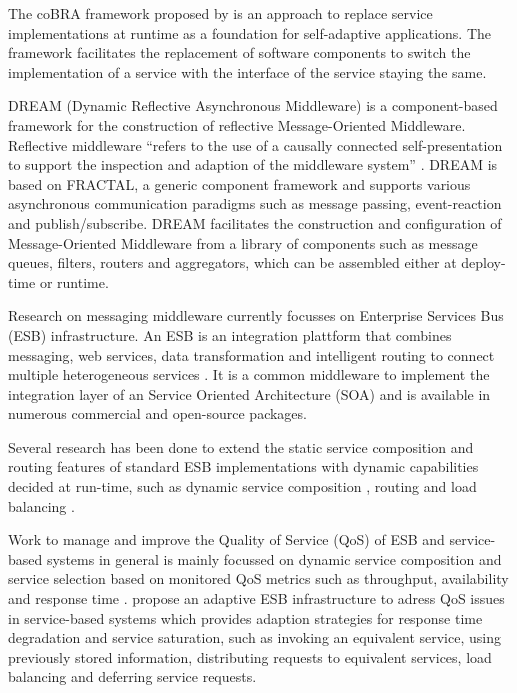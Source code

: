The coBRA framework proposed by \citet{Irmert:2008nx} is an approach to replace service implementations at runtime as a foundation for self-adaptive applications. The framework facilitates the replacement of software components to switch the implementation of a service with the interface of the service staying the same.

DREAM (Dynamic Reflective Asynchronous Middleware) \citep{Leclercq:2004ly} is a component-based framework for the construction of reflective Message-Oriented Middleware. Reflective middleware ``refers to the use of a causally connected self-presentation to support the inspection and adaption of the middleware system'' \citep{Kon:2002fu}. DREAM is based on FRACTAL, a generic component framework and supports various asynchronous communication paradigms such as message passing, event-reaction and publish/subscribe. DREAM facilitates the construction and configuration of Message-Oriented Middleware from a library of components such as message queues, filters, routers and aggregators, which can be assembled either at deploy-time or runtime.

Research on messaging middleware currently focusses on Enterprise Services Bus (ESB) infrastructure. An ESB is an integration plattform that combines messaging, web services, data transformation and intelligent routing to connect multiple heterogeneous services \citep{Chappell:2004jo}. It is a common middleware to implement the integration layer of an Service Oriented Architecture (SOA) and is available in numerous commercial and open-source packages.

Several research has been done to extend the static service composition and routing features of standard ESB implementations with dynamic capabilities decided at run-time, such as dynamic service composition \citep{Chang:2007aa}, routing \citep{Bai:2007aa} \citep{Wu:2008aa} \citep{Ziyaeva:2008aa} and load balancing \citep{Jongtaveesataporn:2010aa}.

Work to manage and improve the Quality of Service (QoS) of ESB and service-based systems in general is mainly focussed on dynamic service composition and service selection based on monitored QoS metrics such as throughput, availability and response time \citep{Calinescu:2011aa}. \cite{Gonzalez:2011} propose an adaptive ESB infrastructure to adress QoS issues in service-based systems which provides adaption strategies for response time degradation and service saturation, such as invoking an equivalent service, using previously stored information, distributing requests to equivalent services, load balancing and deferring service requests.

